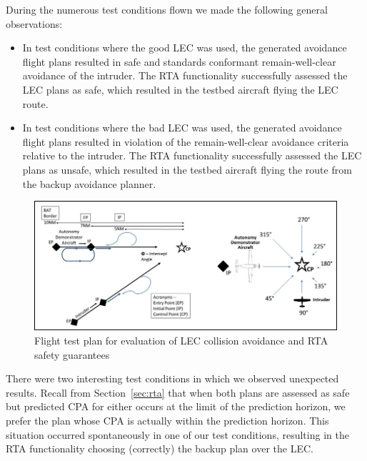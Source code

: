 During the numerous test conditions flown we made the following general observations:
\begin{itemize}
\item In test conditions where the good LEC was used, the generated avoidance flight plans resulted in safe and standards conformant remain-well-clear avoidance of the intruder.  The RTA functionality successfully assessed the LEC plans as safe, which resulted in the testbed aircraft flying the LEC route.  
\item In test conditions where the bad LEC was used, the generated avoidance flight plans resulted in violation of the remain-well-clear avoidance criteria relative to the intruder.  The RTA functionality successfully assessed the LEC plans as unsafe, which resulted in the testbed aircraft flying the route from the backup avoidance planner.  
\end{itemize}


\begin{figure}
	\centering
	\includegraphics[width=.9\textwidth]{figures/flight-test.jpg}
	\caption{Flight test plan for evaluation of LEC collision avoidance and RTA safety guarantees}
	\label{fig:flight-test}
\end{figure}

There were two interesting test conditions in which we observed unexpected results.  Recall from Section~\ref{sec:rta} that when both plans are assessed as safe but predicted CPA for either occurs at the limit of the prediction horizon, we prefer the plan whose CPA is actually within the prediction horizon.  This situation occurred spontaneously in one of our test conditions, resulting in the RTA functionality choosing (correctly) the backup plan over the LEC.  

